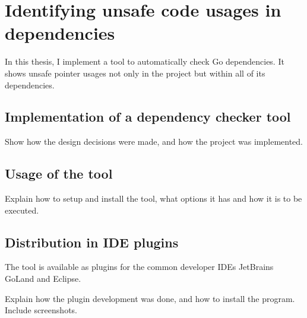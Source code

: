 
\chapter{Identifying unsafe code usages in dependencies}\label{ch:implementation}

In this thesis, I implement a tool to automatically check Go dependencies. It shows unsafe
pointer usages not only in the project but within all of its dependencies.



\section{Implementation of a dependency checker tool}\label{sec:implementation}

Show how the design decisions were made, and how the project was implemented.



\section{Usage of the tool}\label{sec:usage}

Explain how to setup and install the tool, what options it has and how it is to be executed.



\section{Distribution in IDE plugins}\label{sec:ide-plugins}

The tool is available as plugins for the common developer IDEs JetBrains GoLand and Eclipse.

Explain how the plugin development was done, and how to install the program. Include
screenshots.
